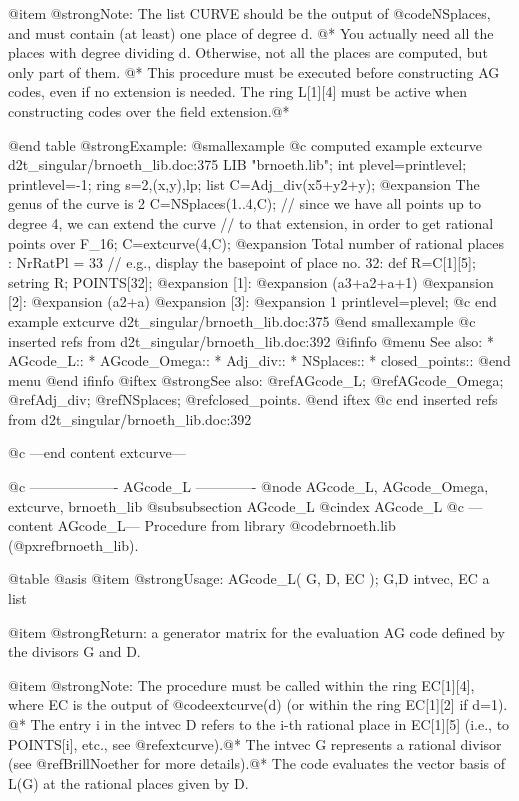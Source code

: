 @item @strong{Note:}
The list CURVE should be the output of @code{NSplaces},
and must contain (at least) one place of degree d. @*
You actually need all the places with degree dividing d.
Otherwise, not all the places are computed, but only part of them. @*
This procedure must be executed before constructing AG codes,
even if no extension is needed. The ring L[1][4] must be active
when constructing codes over the field extension.@*

@end table
@strong{Example:}
@smallexample
@c computed example extcurve d2t_singular/brnoeth_lib.doc:375 
LIB "brnoeth.lib";
int plevel=printlevel;
printlevel=-1;
ring s=2,(x,y),lp;
list C=Adj_div(x5+y2+y);
@expansion{} The genus of the curve is 2
C=NSplaces(1..4,C);
// since we have all points up to degree 4, we can extend the curve
// to that extension, in order to get rational points over F_16;
C=extcurve(4,C);
@expansion{} Total number of rational places : NrRatPl = 33
// e.g., display the basepoint of place no. 32:
def R=C[1][5];
setring R;
POINTS[32];
@expansion{} [1]:
@expansion{}    (a3+a2+a+1)
@expansion{} [2]:
@expansion{}    (a2+a)
@expansion{} [3]:
@expansion{}    1
printlevel=plevel;
@c end example extcurve d2t_singular/brnoeth_lib.doc:375
@end smallexample
@c inserted refs from d2t_singular/brnoeth_lib.doc:392
@ifinfo
@menu
See also:
* AGcode_L::
* AGcode_Omega::
* Adj_div::
* NSplaces::
* closed_points::
@end menu
@end ifinfo
@iftex
@strong{See also:}
@ref{AGcode_L};
@ref{AGcode_Omega};
@ref{Adj_div};
@ref{NSplaces};
@ref{closed_points}.
@end iftex
@c end inserted refs from d2t_singular/brnoeth_lib.doc:392

@c ---end content extcurve---

@c ------------------- AGcode_L -------------
@node AGcode_L, AGcode_Omega, extcurve, brnoeth_lib
@subsubsection AGcode_L
@cindex AGcode_L
@c ---content AGcode_L---
Procedure from library @code{brnoeth.lib} (@pxref{brnoeth_lib}).

@table @asis
@item @strong{Usage:}
AGcode_L( G, D, EC ); G,D intvec, EC a list

@item @strong{Return:}
a generator matrix for the evaluation AG code defined by the
divisors G and D.

@item @strong{Note:}
The procedure must be called within the ring EC[1][4],
where EC is the output of @code{extcurve(d)} (or within
the ring EC[1][2] if d=1). @*
The entry i in the intvec D refers to the i-th rational
place in EC[1][5] (i.e., to POINTS[i], etc., see @ref{extcurve}).@*
The intvec G represents a rational divisor (see @ref{BrillNoether}
for more details).@*
The code evaluates the vector basis of L(G) at the rational
places given by D.

